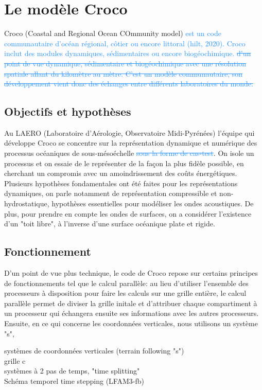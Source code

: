 \documentclass{rapportECC}
\newcommand{\FAadd}[1]{\textcolor{DodgerBlue}{{#1}}}                     %
\newcommand{\FAdel}[1]{\textcolor{DodgerBlue}{\sout{#1}}}                %
\begin{document}
\section{Le modèle Croco}
Croco (Coastal and Regional Ocean COmmunity model) \FAadd{est un code communautaire d'océan régional, côtier ou encore littoral (hilt, 2020). Croco inclut des modules dynamiques, sédimentaires ou encore biogéochimique.} \FAdel{d'un point de vue dynamique, sédimentaire et biogéochimique avec une résolution spatiale allant du kilomètre au mètre. C'est un modèle communautaire, son développement vient donc des échanges entre différents laboratoires du monde.} \\


\subsection{Objectifs et hypothèses}
Au LAERO (Laboratoire d'Aérologie, Observatoire Midi-Pyrénées) l'équipe qui développe Croco se concentre sur la représentation dynamique et numérique des processus océaniques de sous-mésoéchelle \FAdel{sous la forme de cas-test}. On isole un processus et on essaie de le représenter de la façon la plus fidèle possible, en cherchant un compromis avec un amoindrissement des coûts énergétiques. \\
Plusieurs hypothèses fondamentales ont été faites pour les représentations dynamiques, on parle notamment de représentation compressible et non-hydrostatique, hypothèses essentielles pour modéliser les ondes acoustiques. De plus, pour prendre en compte les ondes de surfaces, on a considérer l'existence d'un "toit libre", à l'inverse d'une surface océanique plate et rigide.



\subsection{Fonctionnement}
D'un point de vue plus technique, le code de Croco repose sur certains principes de fonctionnements tel que le calcul parallèle: au lieu d'utiliser l'ensemble des processeurs à disposition pour faire les calculs sur une grille entière, le calcul parallèle permet de diviser la grille initale et d'attribuer chaque compartiment à un processeur qui échangera ensuite ses informations avec les autres processeurs. \\
Ensuite, en ce qui concerne les coordonnées verticales, nous utilisons un système "s", 

systèmes de coordonnées verticales (terrain following "s")\\
grille c\\
systèmes à 2 pas de temps, "time splitting" \\
Schéma temporel time stepping (LFAM3-fb)\\
\end{document}
